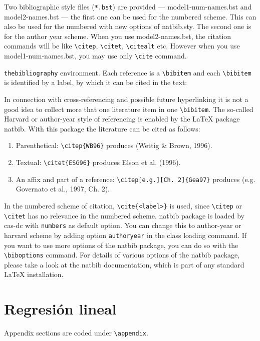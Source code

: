 \documentclass[a4paper,fleqn]{cas-dc}
\begin{document}
Two bibliographic style files (\verb+*.bst+) are provided ---
{model1-num-names.bst} and {model2-names.bst} --- the first one can be
	used for the numbered scheme. This can also be used for the numbered
with new options of {natbib.sty}. The second one is for the author year
scheme. When  you use model2-names.bst, the citation commands will be
like \verb+\citep+,  \verb+\citet+, \verb+\citealt+ etc. However when
you use model1-num-names.bst, you may use only \verb+\cite+ command.

\verb+thebibliography+ environment.  Each reference is a\linebreak
\verb+\bibitem+ and each \verb+\bibitem+ is identified by a label,
by which it can be cited in the text:

\noindent In connection with cross-referencing and
possible future hyperlinking it is not a good idea to collect
more that one literature item in one \verb+\bibitem+.  The
so-called Harvard or author-year style of referencing is enabled
by the \LaTeX{} package {natbib}. With this package the
literature can be cited as follows:

\begin{enumerate}[\textbullet]
\item Parenthetical: \verb+\citep{WB96}+ produces (Wettig \& Brown, 1996).
\item Textual: \verb+\citet{ESG96}+ produces Elson et al. (1996).
\item An affix and part of a reference:\break
\verb+\citep[e.g.][Ch. 2]{Gea97}+ produces (e.g. Governato et
al., 1997, Ch. 2).
\end{enumerate}

In the numbered scheme of citation, \verb+\cite{<label>}+ is used,
since \verb+\citep+ or \verb+\citet+ has no relevance in the numbered
scheme.  {natbib} package is loaded by {cas-dc} with
\verb+numbers+ as default option.  You can change this to author-year
or harvard scheme by adding option \verb+authoryear+ in the class
loading command.  If you want to use more options of the {natbib}
package, you can do so with the \verb+\biboptions+ command.  For
details of various options of the {natbib} package, please take a
look at the {natbib} documentation, which is part of any standard
\LaTeX{} installation.

\appendix
\section{Regresión lineal}
Appendix sections are coded under \verb+\appendix+.
\end{document}
